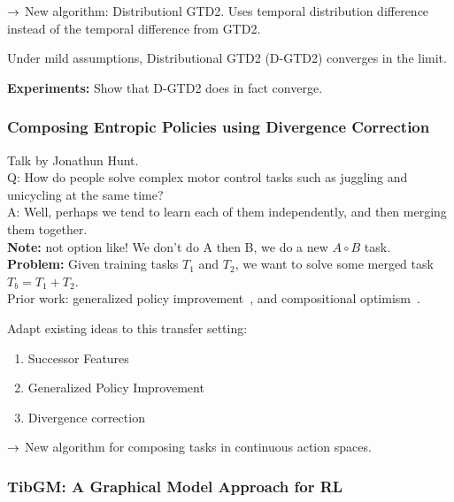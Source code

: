 $\rightarrow$ New algorithm: Distributionl GTD2. Uses temporal distribution difference instead of the temporal difference from GTD2. 

\begin{theorem}
Under mild assumptions, Distributional GTD2 (D-GTD2) converges in the limit.
\end{theorem}

{\bf Experiments:} Show that D-GTD2 does in fact converge.

\spacerule

\subsubsection{Composing Entropic Policies using Divergence Correction~\cite{hunt2018composing}}

Talk by Jonathun Hunt. \\

Q: How do people solve complex motor control tasks such as juggling and unicycling at the same time? \\

A: Well, perhaps we tend to learn each of them independently, and then merging them together. \\

{\bf Note:} not option like! We don't do A then B, we do a new $A \circ B$ task. \\

{\bf Problem:} Given training tasks $T_1$ and $T_2$, we want to solve some merged task $T_b = T_1 + T_2$. \\

Prior work: generalized policy improvement~\cite{barreto2017successor}, and compositional optimism~\cite{Haarnoja}.

Adapt existing ideas to this transfer setting:
\begin{enumerate}
    \item Successor Features
    \item Generalized Policy Improvement
    \item Divergence correction
\end{enumerate}

$\rightarrow$ New algorithm for composing tasks in continuous action spaces. \\

\spacerule

\subsubsection{TibGM: A Graphical Model Approach for RL~\cite{adel2019tibgm}}

